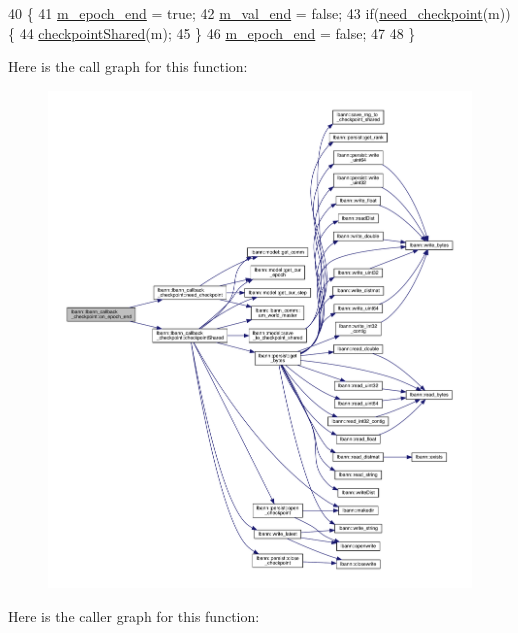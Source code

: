 \begin{DoxyCode}
40                                                      \{
41   \hyperlink{classlbann_1_1lbann__callback__checkpoint_a9632d5f0078d3ff2015e96dba789e15c}{m\_epoch\_end} = \textcolor{keyword}{true};
42   \hyperlink{classlbann_1_1lbann__callback__checkpoint_a3827e5bb569f80d790c3ac856a7c39b5}{m\_val\_end} = \textcolor{keyword}{false}; 
43   \textcolor{keywordflow}{if}(\hyperlink{classlbann_1_1lbann__callback__checkpoint_a2e5f396667ccc45f7203263b06c5e216}{need\_checkpoint}(m))\{
44     \hyperlink{classlbann_1_1lbann__callback__checkpoint_a23b6f5abb924b2c4d0694e98c7d6f4d5}{checkpointShared}(m);
45   \}
46   \hyperlink{classlbann_1_1lbann__callback__checkpoint_a9632d5f0078d3ff2015e96dba789e15c}{m\_epoch\_end} = \textcolor{keyword}{false};
47   
48 \}
\end{DoxyCode}
Here is the call graph for this function\+:\nopagebreak
\begin{figure}[H]
\begin{center}
\leavevmode
\includegraphics[width=350pt]{classlbann_1_1lbann__callback__checkpoint_a406bfba673e503e94ae6eb57aff6a78e_cgraph}
\end{center}
\end{figure}
Here is the caller graph for this function\+:\nopagebreak
